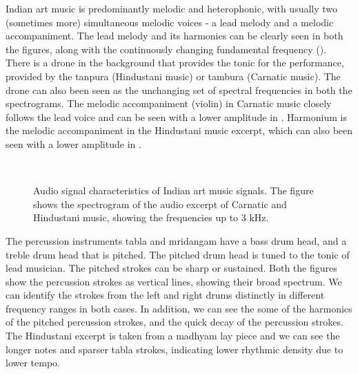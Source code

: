 Indian art music is predominantly melodic and heterophonic, with usually two (sometimes more) simultaneous melodic voices - a lead melody and a melodic accompaniment. The lead melody and its harmonics can be clearly seen in both the figures, along with the continuously changing fundamental frequency (\fzero). There is a drone in the background that provides the tonic for the performance, provided by the \gls{tanpura} (Hindustani music) or \gls{tambura} (Carnatic music). The drone can also been seen as the unchanging set of spectral frequencies in both the spectrograms. The melodic accompaniment (violin) in Carnatic music closely follows the lead voice and can be seen with a lower amplitude in . Harmonium is the melodic accompaniment in the Hindustani music excerpt, which can also been seen with a lower amplitude in . 
%
\begin{figure}
\centering
     \\ 
\caption[Audio signal characteristics of Indian art music signals]{Audio signal characteristics of Indian art music signals. The figure shows the spectrogram of the audio excerpt of Carnatic and Hindustani music, showing the frequencies up to 3 kHz.}\label{fig:sigdesc:iam}
\end{figure}

The percussion instruments \gls{tabla} and mridangam have a bass drum head, and a treble drum head that is pitched. The pitched drum head is tuned to the tonic of lead musician. The pitched strokes can be sharp or sustained. Both the figures show the percussion strokes as vertical lines, showing their broad spectrum. We can identify the strokes from the left and right drums distinctly in different frequency ranges in both cases. In addition, we can see the some of the harmonics of the pitched percussion strokes, and the quick decay of the percussion strokes. The Hindustani excerpt is taken from a \gls{madhyam} \gls{lay} piece and we can see the longer notes and sparser \gls{tabla} strokes, indicating lower rhythmic density due to lower tempo. 
%
